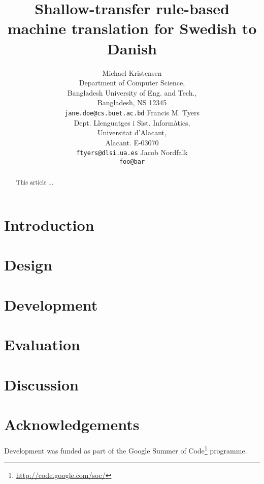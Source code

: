 \documentclass[11pt]{article}
\title{Shallow-transfer rule-based machine translation for Swedish to Danish}
\author{Michael Kristensen\\
  Department of Computer Science, \\
  Bangladesh University of Eng. and Tech.,\\
  Bangladesh, NS 12345 \\
  {\tt jane.doe@cs.buet.ac.bd} \And
  Francis M. Tyers\\
  Dept. Llenguatges i Sist. Informàtics, \\
  Universitat d'Alacant,\\
  Alacant. E-03070\\  
  {\tt ftyers@dlsi.ua.es} \And
  Jacob Nordfalk\\
  {\tt foo@bar}}
\date{}
\begin{document}
\maketitle

\begin{abstract}
  This article ...
\end{abstract}

\section{Introduction}

\citep{Dasgupta2005}

\section{Design}

\section{Development}

\section{Evaluation}

\section{Discussion}

\section*{Acknowledgements}

Development was funded as part of the Google Summer of Code\footnote{\url{http://code.google.com/soc/}} programme.



\end{document}
